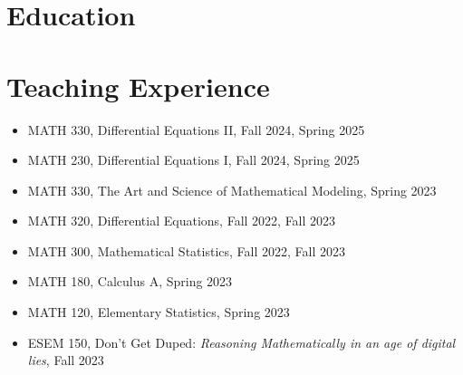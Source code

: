 \documentclass[11pt,a4paper]{moderncv}
\begin{document}
\maketitle


\section{Education}





\section{Teaching Experience}

\begin{itemize}[leftmargin=4cm]
	\item MATH 330, Differential Equations II, Fall 2024, Spring 2025
	\item MATH 230, Differential Equations I, Fall 2024, Spring 2025
\end{itemize}

\begin{itemize}[leftmargin=4cm]
	\item MATH 330, The Art and Science of Mathematical Modeling, Spring 2023
	\item MATH 320, Differential Equations, Fall 2022, Fall 2023
	\item MATH 300, Mathematical Statistics, Fall 2022, Fall 2023
	\item MATH 180, Calculus A, Spring 2023
	\item MATH 120, Elementary Statistics, Spring 2023
	\item ESEM 150, Don't Get Duped: \textit{Reasoning Mathematically in an age of digital lies}, Fall 2023
\end{itemize}
\end{document}
